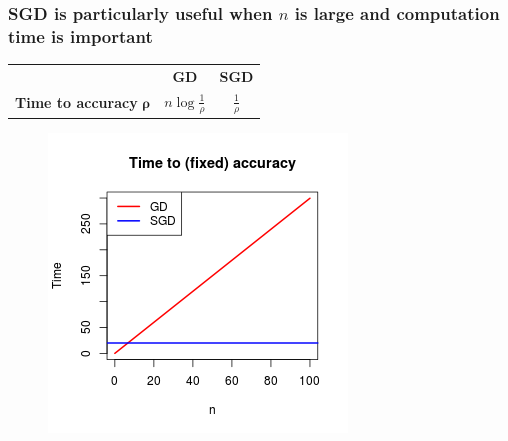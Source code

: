 \documentclass{beamer}
\begin{document}
\begin{frame}
	\frametitle{SGD is particularly useful when $n$ is large and computation
	time is important}
	\begin{table}[t]
		\begin{tabular}{|l|c|c|}
			\hline
			& \textbf{GD} & \textbf{SGD} \\
			\textbf{Time to accuracy} $\mathbf{\rho}$ & $n \log
			\frac{1}{\rho}$ & $\frac{1}{\rho}$ \\
			\hline
		\end{tabular}
	\end{table}

	\begin{figure}
	\centering
	\includegraphics[scale=0.55]{comparison}
	\end{figure}

			
\end{frame}
\end{document}
